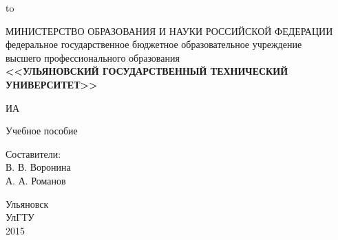 \begin{titlepage}
\vbox to \textheight
{
\begin{center}
\begin{normalsize}
	МИНИСТЕРСТВО ОБРАЗОВАНИЯ И НАУКИ РОССИЙСКОЙ ФЕДЕРАЦИИ \\
	федеральное государственное бюджетное образовательное учреждение \\
	высшего профессионального образования \\
	\bf <<УЛЬЯНОВСКИЙ ГОСУДАРСТВЕННЫЙ ТЕХНИЧЕСКИЙ УНИВЕРСИТЕТ>>
\end{normalsize}
\end{center}
\vspace{5cm}
\begin{center}
\bf
\begin{LARGE}
ИА
\end{LARGE}
\end{center}
\medskip
\begin{center}
Учебное пособие
\end{center}
\vspace{2cm}
\begin{flushright}
Составители:\\
В. В. Воронина\\
А. А. Романов
\end{flushright}
\vfill
\begin{center}
Ульяновск\\
УлГТУ\\
2015
\end{center}
}
\end{titlepage}